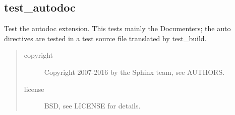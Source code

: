 \documentclass[letterpaper,10pt,english]{sphinxhowto}
\begin{document}
\subsection{test\_autodoc}
\label{autodoc:test-autodoc}
Test the autodoc extension.  This tests mainly the Documenters; the auto
directives are tested in a test source file translated by test\_build.
\begin{quote}\begin{description}
\item[{copyright}] \leavevmode
Copyright 2007-2016 by the Sphinx team, see AUTHORS.

\item[{license}] \leavevmode
BSD, see LICENSE for details.

\end{description}\end{quote}
\end{document}

